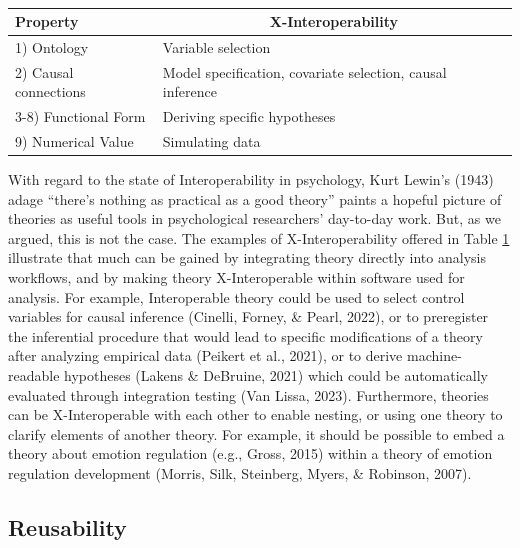 \documentclass[
  man, noextraspace,floatsintext]{apa6}
\begin{document}
\begin{table}[tbp]

\begin{center}
\begin{threeparttable}

\caption{\label{tab:tabmeehl}}

\begin{tabular}{ll}
\toprule
Property & \multicolumn{1}{c}{X-Interoperability}\\
\midrule
1) Ontology & Variable selection\\
2) Causal connections & Model specification, covariate selection, causal inference\\
3-8) Functional Form & Deriving specific hypotheses\\
9) Numerical Value & Simulating data\\
\bottomrule
\end{tabular}

\end{threeparttable}
\end{center}

\end{table}

With regard to the state of Interoperability in psychology,
Kurt Lewin's (1943) adage ``there's nothing as practical as a good theory'' paints a hopeful picture of theories as useful tools in psychological researchers' day-to-day work.
But, as we argued, this is not the case.
The examples of X-Interoperability offered in Table \ref{tab:tabmeehl} illustrate that much can be gained by integrating theory directly into analysis workflows, and by making theory X-Interoperable within software used for analysis.
For example, Interoperable theory could be used
to select control variables for causal inference (Cinelli, Forney, \& Pearl, 2022),
or to preregister the inferential procedure that would lead to specific modifications of a theory after analyzing empirical data (Peikert et al., 2021),
or to derive machine-readable hypotheses (Lakens \& DeBruine, 2021) which could be automatically evaluated through integration testing (Van Lissa, 2023).
Furthermore, theories can be X-Interoperable with each other to enable nesting, or using one theory to clarify elements of another theory.
For example, it should be possible to embed a theory about emotion regulation (e.g., Gross, 2015) within a theory of emotion regulation development (Morris, Silk, Steinberg, Myers, \& Robinson, 2007).

\subsection{Reusability}\label{reusability}
\end{document}

